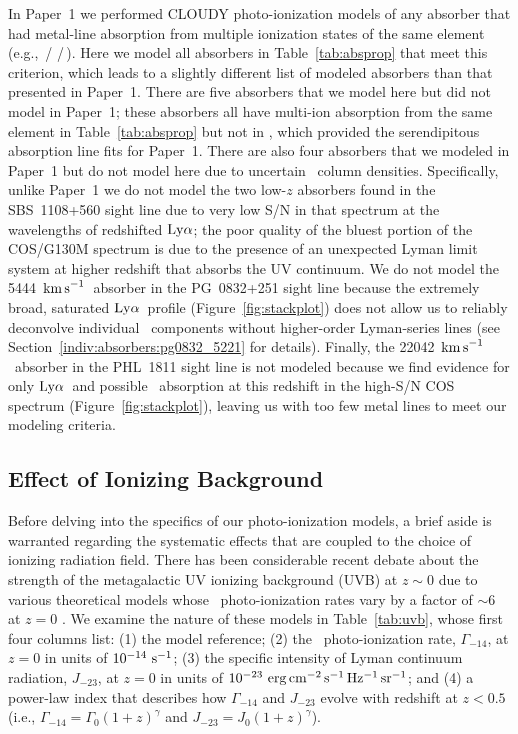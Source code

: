 \documentclass[twocolumn,twocolappendix,tighten,times]{aastex6}
\newcommand{\HI}{\ion{H}{1}}
\newcommand{\SiII}{\ion{Si}{2}}
\newcommand{\SiIII}{\ion{Si}{3}}
\newcommand{\SiIV}{\ion{Si}{4}}
\newcommand{\kms}{\ensuremath{{\rm km\,s}^{-1}}}
\newcommand{\lya}{\ensuremath{{\rm Ly}\alpha}}
\begin{document}
In Paper~1 we performed CLOUDY photo-ionization models \citep{ferland98} of any 
absorber that had metal-line absorption from multiple ionization states of the 
same element (e.g., \SiII\,/\,\SiIII\,/\,\SiIV). Here we model all absorbers in 
Table~\ref{tab:absprop} that meet this criterion, which leads to a slightly 
different list of modeled absorbers than that presented in Paper~1. There are 
five absorbers that we model here but did not model in Paper~1; these absorbers 
all have multi-ion absorption from the same element in Table~\ref{tab:absprop} 
but not in \citet{danforth08}, which provided the serendipitous absorption line 
fits for Paper~1. There are also four absorbers that we modeled in Paper~1 but do 
not model here due to uncertain \HI\ column densities. Specifically, unlike 
Paper~1 we do not model the two low-$z$ absorbers found in the SBS~1108+560 
sight line due to very low S/N in that spectrum at the wavelengths of redshifted 
\lya; the poor quality of the bluest portion of the COS/G130M spectrum is due to 
the presence of an unexpected Lyman limit system at higher redshift that absorbs 
the UV continuum. We do not model the 5444~\kms\ absorber in the PG~0832+251 
sight line because the extremely broad, saturated \lya\ profile 
(Figure~\ref{fig:stackplot}) does not allow us to reliably deconvolve individual 
\HI\ components without higher-order Lyman-series lines (see
Section~\ref{indiv:absorbers:pg0832_5221} for details). Finally, the 
22042~\kms\ absorber in the PHL~1811 sight line is not modeled because 
we find evidence for only \lya\ and possible \SiIII\ absorption at this redshift
in the high-S/N COS spectrum (Figure~\ref{fig:stackplot}), leaving us with too 
few metal lines to meet our modeling criteria.





\subsection{Effect of Ionizing Background}
\label{cloudy:UVB}

Before delving into the specifics of our photo-ionization models, a brief 
aside is warranted regarding the systematic effects that are coupled to the 
choice of ionizing radiation field. There has been considerable recent 
debate about the strength of the metagalactic UV ionizing background (UVB) at 
$z\sim0$ due to various theoretical models whose \HI\ photo-ionization rates 
vary by a factor of $\sim6$ at $z=0$ 
\citep{haardt96,haardt01,haardt05,haardt12,shull99,shull15,faucher-giguere09,kollmeier14,khaire15,madau15,gaikwad16}.
We examine the nature of these models in Table~\ref{tab:uvb}, whose first 
four columns list: (1) the model reference; (2) the \HI\ photo-ionization rate, 
$\Gamma_{-14}$, at $z=0$ in units of $10^{-14}~{\rm s}^{-1}$; (3) the 
specific intensity of Lyman continuum radiation, $J_{-23}$, at $z=0$ in units of 
$10^{-23}~{\rm erg\,cm^{-2}\,s^{-1}\,Hz^{-1}\,sr^{-1}}$; and (4) a power-law index 
that describes how $\Gamma_{-14}$ and $J_{-23}$ evolve with redshift at $z<0.5$ 
(i.e., $\Gamma_{-14} = \Gamma_0 (1+z)^{\gamma}$ and $J_{-23} = J_0 (1+z)^{\gamma}$). 
\end{document}
